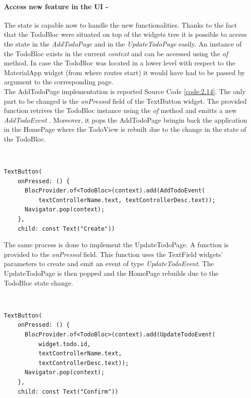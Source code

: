 \paragraph{Access new feature in the UI - }\label{subpar:todo_app_bloc_core_state}

The state is capable now to handle the new functionalities. Thanks to the fact that the TodoBloc were situated on top of the widgets tree it is possible  to access the state in the \textit{AddTodoPage} and in the \textit{UpdateTodoPage} easily. An instance of the TodoBloc exists in the current \textit{context} and can be accessed using the \textit{of} method. In case the TodoBloc was located in a lower level with respect to the MaterialApp widget (from where routes start) it would have had to be passed by argument to the corresponding page.\\
The AddTodoPage implementation is reported Source Code \ref{code:2.14}. The only part to be changed is the \textit{onPressed} field of the TextButton widget. The provided function retrives the TodoBloc instance using the \textit{of} method and emitts a new \textit{AddTodoEvent }. Moreover, it pops the AddTodoPage bringin back the application in the HomePage where the TodoView is rebuilt due to the change in the state of the TodoBloc.
\begin{code}
\mbox{}\\
 \mbox{}
\label{code:2.14}
\begin{verbatim}
TextButton(
    onPressed: () {
      BlocProvider.of<TodoBloc>(context).add(AddTodoEvent(
          textControllerName.text, textControllerDesc.text));
      Navigator.pop(context);
    },
    child: const Text("Create"))
\end{verbatim}
\mbox{}
\end{code}

The same process is done to implement the UpdateTodoPage.  A function is provided to the \textit{onPressed} field. This function uses the TextField widgets’ parameters to create and emit an event of type \textit{UpdateTodoEvent}. The UpdateTodoPage is then popped and the HomePage rebuilds due to the TodoBloc state change.
\begin{code}
\mbox{}\\
 \mbox{}
\label{code:2.14}
\begin{verbatim}
TextButton(
    onPressed: () {
      BlocProvider.of<TodoBloc>(context).add(UpdateTodoEvent(
          widget.todo.id,
          textControllerName.text,
          textControllerDesc.text));
      Navigator.pop(context);
    },
    child: const Text("Confirm"))
\end{verbatim}
\mbox{}
\end{code}

